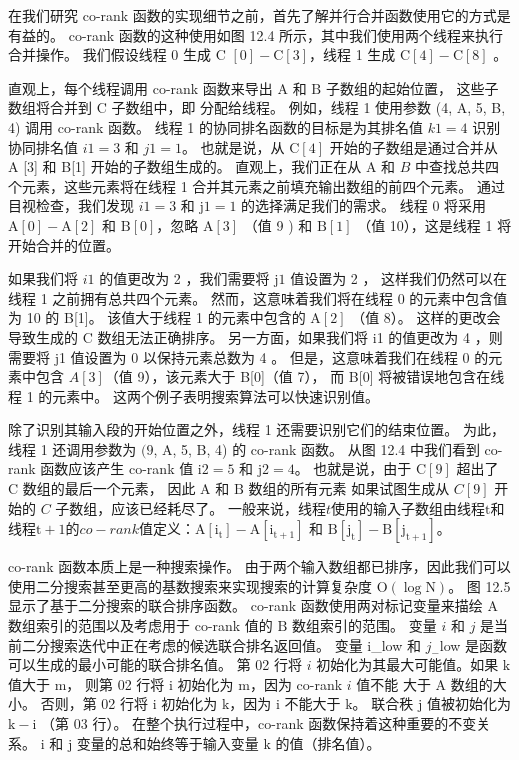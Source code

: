 在我们研究 co-rank 函数的实现细节之前，首先了解并行合并函数使用它的方式是有益的。 
co-rank 函数的这种使用如图 12.4 所示，其中我们使用两个线程来执行合并操作。 
我们假设线程 0 生成 $\mathrm{C}$ $[0]-\mathrm{C}[3]$，线程 1 生成 $\mathrm{C}[4]-\mathrm{C}[8]$ 。

直观上，每个线程调用 co-rank 函数来导出 $\mathrm{A}$ 和 $\mathrm{B}$ 子数组的起始位置，
这些子数组将合并到 $\mathrm{C}$ 子数组中，即 分配给线程。 例如，线程 1 使用参数 (4, A, 5, B, 4) 调用 co-rank 函数。 
线程 1 的协同排名函数的目标是为其排名值 $k 1=4$ 识别协同排名值 $i 1=3$ 和 $j 1=1$。 
也就是说，从 $\mathrm{C}[4]$ 开始的子数组是通过合并从 $\mathrm{A}$ [3] 和 B[1] 开始的子数组生成的。 
直观上，我们正在从 A 和 $B$ 中查找总共四个元素，这些元素将在线程 1 合并其元素之前填充输出数组的前四个元素。 
通过目视检查，我们发现 $i 1=3$ 和 $\mathrm{j} 1=1$ 的选择满足我们的需求。 
线程 0 将采用 $\mathrm{A}[0]-\mathrm{A}[2]$ 和 $\mathrm{B}[0]$，忽略 $\mathrm{A}[3]$ （值 9 ) 和 $\mathrm{B}[1]$ （值 10），这是线程 1 将开始合并的位置。

如果我们将 $i 1$ 的值更改为 2 ，我们需要将 $\mathrm{j} 1$ 值设置为 2 ，
这样我们仍然可以在线程 1 之前拥有总共四个元素。 然而，这意味着我们将在线程 0 的元素中包含值为 10 的 B[1]。 
该值大于线程 1 的元素中包含的 $\mathrm{A}[2]$ （值 8）。 这样的更改会导致生成的 $\mathrm{C}$ 数组无法正确排序。 
另一方面，如果我们将 i1 的值更改为 4 ，则需要将 j1 值设置为 0 以保持元素总数为 4 。 
但是，这意味着我们在线程 0 的元素中包含 $A[3]$（值 9），该元素大于 B[0]（值 7），
而 B[0] 将被错误地包含在线程 1 的元素中。 这两个例子表明搜索算法可以快速识别值。

除了识别其输入段的开始位置之外，线程 1 还需要识别它们的结束位置。 
为此，线程 1 还调用参数为 $(9$, A, 5, B, 4) 的 co-rank 函数。 
从图 12.4 中我们看到 co-rank 函数应该产生 co-rank 值 $\mathrm{i} 2=5$ 和 $\mathrm{j} 2=4$。 
也就是说，由于 $\mathrm{C}[9]$ 超出了 $\mathrm{C}$ 数组的最后一个元素，
因此 $\mathrm{A}$ 和 $\mathrm{B}$ 数组的所有元素 如果试图生成从 $C[9]$ 开始的 $C$ 子数组，应该已经耗尽了。 
一般来说，线程$t$使用的输入子数组由线程$\mathrm{t}$和线程$\mathrm{t}+1的co-rank值定义：\mathrm{A}\left[ \mathrm{i}_{\mathrm{t}}\right]-\mathrm{A}\left[\mathrm{i}_{\mathrm{t}+1}\right]$ 和 $\mathrm{B }\left[\mathrm{j}_{\mathrm{t}}\right]-\mathrm{B}\left[\mathrm{j}_{\mathrm{t}+1}\right]$。

co-rank 函数本质上是一种搜索操作。 
由于两个输入数组都已排序，因此我们可以使用二分搜索甚至更高的基数搜索来实现搜索的计算复杂度 $\mathrm{O}(\log \mathrm{N})$。 图 12.5 显示了基于二分搜索的联合排序函数。 
co-rank 函数使用两对标记变量来描绘 $\mathrm{A}$ 数组索引的范围以及考虑用于 co-rank 值的 $\mathrm{B}$ 数组索引的范围。 变量 $i$ 和 $j$ 是当前二分搜索迭代中正在考虑的候选联合排名返回值。 
变量 i\_low 和 $j_{-}$low 是函数可以生成的最小可能的联合排名值。 
第 02 行将 $i$ 初始化为其最大可能值。如果 $\mathrm{k}$ 值大于 $\mathrm{m}$，
则第 02 行将 $\mathrm{i}$ 初始化为 $\mathrm{m}$，因为 co-rank $i$ 值不能 大于 A 数组的大小。 
否则，第 02 行将 $\mathrm{i}$ 初始化为 $\mathrm{k}$，因为 $\mathrm{i}$ 不能大于 $\mathrm{k}$。 
联合秩 $\mathrm{j}$ 值被初始化为 $\mathrm{k}-\mathrm{i}$ （第 03 行）。 
在整个执行过程中，co-rank 函数保持着这种重要的不变关系。 
$\mathrm{i}$ 和 $\mathrm{j}$ 变量的总和始终等于输入变量 $\mathrm{k}$ 的值（排名值）。

